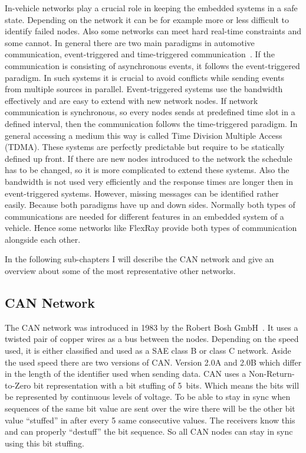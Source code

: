 In-vehicle networks play a crucial role in keeping the embedded systems in a
safe state. Depending on the network it can be for example more or less
difficult to identify failed nodes. Also some networks can meet hard real-time
constraints and some cannot. In general there are two main paradigms in
automotive communication, event-triggered and time-triggered
communication~\cite{Navet2017}. If the communication is consisting of
asynchronous events, it follows the event-triggered paradigm. In such systems it
is crucial to avoid conflicts while sending events from multiple sources in
parallel. Event-triggered systems use the bandwidth effectively and are easy to
extend with new network nodes. If network communication is synchronous, so every
nodes sends at predefined time slot in a defined interval, then the
communication follows the time-triggered paradigm. In general accessing a medium
this way is called Time Division Multiple Access (TDMA). These systems are
perfectly predictable but require to be statically defined up front. If there
are new nodes introduced to the network the schedule has to be changed, so it is
more complicated to extend these systems. Also the bandwidth is not used very
efficiently and the response times are longer then in event-triggered systems.
However, missing messages can be identified rather easily. Because both paradigms
have up and down sides. Normally both types of communications are needed for
different features in an embedded system of a vehicle. Hence some networks like
FlexRay provide both types of communication alongside each other.

In the following sub-chapters I will describe the CAN network and give an
overview about some of the most representative other networks.

\subsection{CAN Network}

The CAN network was introduced in 1983 by the Robert Bosh GmbH~\cite{Navet2017}.
It uses a twisted pair of copper wires as a bus between the nodes. Depending on
the speed used, it is either classified and used as a SAE class B or class C
network. Aside the used speed there are two versions of CAN\@. Version 2.0A and
2.0B which differ in the length of the identifier used when sending data. CAN
uses a Non-Return-to-Zero bit representation with a bit stuffing of 5~bits.
Which means the bits will be represented by continuous levels of voltage. To be
able to stay in sync when sequences of the same bit value are sent over the wire
there will be the other bit value ``stuffed'' in after every 5 same consecutive
values. The receivers know this and can properly ``destuff'' the bit sequence.
So all CAN nodes can stay in sync using this bit stuffing. 

